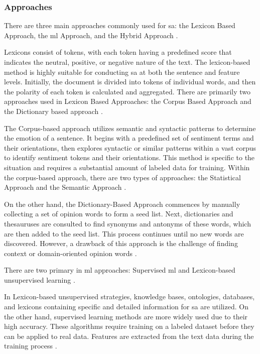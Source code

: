 \documentclass[a4paper,fleqn]{cas-dc}
\begin{document}
\subsubsection{Approaches}

There are three main approaches commonly used for \gls{sa}: the Lexicon Based Approach, the \gls{ml} Approach, and the Hybrid Approach \cite{wankhade_survey_2022, kaur_survey_2017}.

Lexicons consist of tokens, with each token having a predefined score that indicates the neutral, positive, or negative nature of the text. The lexicon-based method is highly suitable for conducting \gls{sa} at both the sentence and feature levels. Initially, the document is divided into tokens of individual words, and then the polarity of each token is calculated and aggregated. There are primarily two approaches used in Lexicon Based Approaches: the Corpus Based Approach and the Dictionary based approach \cite{wankhade_survey_2022}.

The Corpus-based approach utilizes semantic and syntactic patterns to determine the emotion of a sentence. It begins with a predefined set of sentiment terms and their orientations, then explores syntactic or similar patterns within a vast corpus to identify sentiment tokens and their orientations. This method is specific to the situation and requires a substantial amount of labeled data for training. Within the corpus-based approach, there are two types of approaches: the Statistical Approach and the Semantic Approach \cite{wankhade_survey_2022, kaur_survey_2017}.

On the other hand, the Dictionary-Based Approach commences by manually collecting a set of opinion words to form a seed list. Next, dictionaries and thesauruses are consulted to find synonyms and antonyms of these words, which are then added to the seed list. This process continues until no new words are discovered. However, a drawback of this approach is the challenge of finding context or domain-oriented opinion words \cite{wankhade_survey_2022, kaur_survey_2017}.

There are two primary in \gls{ml} approaches: Supervised \gls{ml} and Lexicon-based unsupervised learning \cite{wankhade_survey_2022}.

In Lexicon-based unsupervised strategies, knowledge bases, ontologies, databases, and lexicons containing specific and detailed information for \gls{sa} are utilized. On the other hand, supervised learning methods are more widely used due to their high accuracy. These algorithms require training on a labeled dataset before they can be applied to real data. Features are extracted from the text data during the training process \cite{kaur_survey_2017}.
\end{document}
